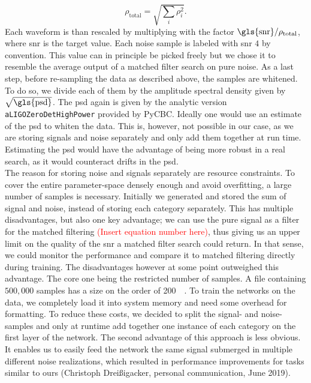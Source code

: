 \begin{equation}
\rho_\text{total} = \sqrt{\sum_i\rho_i^2}.
\end{equation}
Each waveform is than rescaled by multiplying with the factor $\text{\gls{snr}} / \rho_\text{total}$, where \gls{snr} is the target value. Each noise sample is labeled with \gls{snr} $4$ by convention. This value can in principle be picked freely but we chose it to resemble the average output of a matched filter search on pure noise. As a last step, before re-sampling the data as described above, the samples are whitened. To do so, we divide each of them by the amplitude spectral density given by $\sqrt{\text{\gls{psd}}}$. The \gls{psd} again is given by the analytic version \verb|aLIGOZeroDetHighPower| provided by PyCBC. Ideally one would use an estimate of the \gls{psd} to whiten the data. This is, however, not possible in our case, as we are storing signals and noise separately and only add them together at run time. Estimating the \gls{psd} would have the advantage of being more robust in a real search, as it would counteract drifts in the \gls{psd}.\\
The reason for storing noise and signals separately are resource constraints. To cover the entire parameter-space densely enough and avoid overfitting, a large number of samples is necessary. Initially we generated and stored the sum of signal and noise, instead of storing each category separately. This has multiple disadvantages, but also one key advantage; we can use the pure signal as a filter for the matched filtering \textcolor{red}{(Insert equation number here)}, thus  giving us an upper limit on the quality of the \gls{snr} a matched filter search could return. In that sense, we could monitor the performance and compare it to matched filtering directly during training. The disadvantages however at some point outweighed this advantage. The core one being the restricted number of samples. A file containing $500,000$ samples has a size on the order of \SI{200}{\giga\byte}. To train the networks on the data, we completely load it into system memory and need some overhead for formatting. To reduce these costs, we decided to split the signal- and noise-samples and only at runtime add together one instance of each category on the first layer of the network. The second advantage of this approach is less obvious. It enables us to easily feed the network the same signal submerged in multiple different noise realizations, which resulted in performance improvements for tasks similar to ours (Christoph Dreißigacker, personal communication, June 2019).\\
